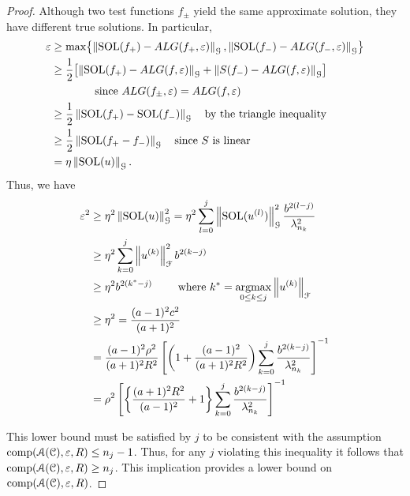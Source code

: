 \documentclass[USenglish]{article}
\theoremstyle{dgthm}
\theoremstyle{dgthm}
\theoremstyle{dgthm}
\theoremstyle{dgthm}
\theoremstyle{dgdef}
\theoremstyle{definition}
\DeclareMathOperator{\SOL}{SOL}
\newcommand{\norm}[2][{}]{\ensuremath{\left \lVert #2 \right \rVert}_{#1}}
\begin{document}
\begin{proof}
Although two test functions $f_\pm$ yield the same approximate solution, they have different true solutions.  In particular,
\begin{align*}
\varepsilon &\ge \max \bigl\{\norm[\calG]{\SOL(f_+) - ALG(f_+,\varepsilon)}, \norm[\calG]{\SOL(f_-) - ALG(f_-,\varepsilon)} \bigr\} \\
&\ge \frac 12 \bigl[\norm[\calG]{\SOL(f_+) - ALG(f,\varepsilon)} + \norm[\calG]{S(f_-) - ALG(f,\varepsilon)}  \bigr] \\
&\qquad \qquad \text{since } ALG(f_\pm,\varepsilon) = ALG(f,\varepsilon) \\
&\ge \frac 12 \norm[\calG]{\SOL(f_+) - \SOL(f_-)} \quad \text{by the triangle inequality}\\
&\ge \frac 12 \norm[\calG]{\SOL(f_+ - f_-)} \quad \text{since $S$ is linear}\\
&= \eta \norm[\calG]{\SOL(u)}.
\end{align*}
Thus, we have
\begin{align*}
\varepsilon^2  & \ge \eta^2 \norm[\calG]{\SOL(u)}^2= 
\eta^2 \sum_{l=0}^{j} \norm[\calG]{\SOL(u^{(l)})}^2  \frac{b^{2(l-j)}}{\lambda_{n_k}^2}\\
& \ge \eta^2 
\sum_{k=0}^{j} \norm[\calF]{u^{(k)}}^2 
b^{2(k-j)}\\
& \ge  \eta^2 b^{2(k^{*}-j)} \qquad \text{ where } k^* = \argmax_{0 \le k \le j} \norm[\calF]{u^{(k)}} \\
& \ge \eta^2 = \frac{(a-1)^2c^2}{(a+1)^2} \\
&
=\frac{(a-1)^2 \rho^2}{(a+1)^2R^2}\left[\left(1+\frac{(a-1)^2}{(a+1)^{2} R^2 }\right)\sum_{k=0}^j \frac{b^{2(k-j)}}{\lambda_{n_{k}}^2}\right]^{-1} \\
& =  \rho^2 \left[\left\{\frac{(a+1)^{2} R^2 }{(a-1)^2} + 1\right\}\sum_{k=0}^j \frac{b^{2(k-j)}}{\lambda_{n_{k}}^2}\right]^{-1} 
\end{align*}

This lower bound must be satisfied by $j$ to be consistent with the assumption $\textup{comp}({\mathcal{A}}({\mathcal{C}}),\varepsilon,R) \leq n_j - 1$.  Thus, for any $j$ violating this inequality it follows that $\textup{comp}({\mathcal{A}}({\mathcal{C}}),\varepsilon,R) \geq n_j$.  This implication provides a lower bound on $\textup{comp}({\mathcal{A}}({\mathcal{C}}),\varepsilon,R)$.
\end{proof}
\end{document}
